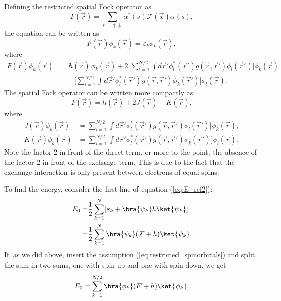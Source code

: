Defining the restricted spatial Fock operator as
\begin{equation}
 F(\vec r) = \sum_{s=\uparrow\downarrow}\alpha^*(s)\mathcal F(\vec x)\alpha(s),
\end{equation}
the equation can be written as
\begin{equation}
\label{eq:RHF}
 F(\vec r)\phi_k(\vec r) = \varepsilon_k\phi_k(\vec r),
\end{equation}
where
\begin{equation}
\begin{split}
 F(\vec r)\phi_k(\vec r) = & h(\vec r)\,\phi_k(\vec r)  + 2\Big[\sum_{l=1}^{N/2}\int d\vec r'\phi^*_l(\vec r')g(\vec r, \vec r')\phi_l(\vec r')\Big]\phi_k(\vec r) \\
                       & - \Big[\sum_{l=1}^{N/2}\int d\vec r'\phi^*_l(\vec r')g(\vec r, \vec r')\phi_k(\vec r')\Big]\phi_l(\vec r).
\end{split}
\end{equation}
The spatial Fock operator can be written more compactly as
\begin{equation}
\label{eq:restricted_Fock_operator}
 F(\vec r) = h(\vec r) + 2 J(\vec r) - K(\vec r),
\end{equation}
where
\begin{align}
 J(\vec r)\phi_k(\vec r) & = \sum_{l=1}^{N/2}\int d\vec r'\phi^*_l(\vec r')g(\vec r, \vec r')\phi_l(\vec r')\Big]\phi_k(\vec r), \\
 K(\vec r)\phi_k(\vec r) & = \sum_{l=1}^{N/2}\int d\vec r'\phi^*_l(\vec r')g(\vec r, \vec r')\phi_k(\vec r')\Big]\phi_l(\vec r).
\end{align}
Note the factor 2 in front of the direct term, or more to the point, the absence of the factor 2 in front of the exchange term. This is due to the fact that
the exchange interaction is only present between electrons of equal spins.

To find the energy, consider the first line of equation (\ref{eq:E_ref2}):
\begin{equation}
\begin{split}
 E_0 = & \frac{1}{2}\sum_{k=1}^N[\varepsilon_k + \bra{\psi_k}h\ket{\psi_k}] \\
         = & \frac{1}{2}\sum_{k=1}^{N}\bra{\psi_k}(\mathcal{F} + h)\ket{\psi_k}.
\end{split}
\end{equation}
If, as we did above, insert the assumption (\ref{eq:restricted_spinorbitals}) and split the sum in two sums, one with spin up and one with spin down, we get
\begin{equation}
\label{eq:E_ref3}
 E_0 = \sum_{k=1}^{N/2}\bra{\phi_k}(F + h)\ket{\phi_k}.
\end{equation}


